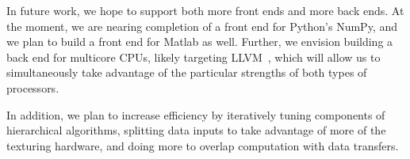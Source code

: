 \documentclass[preprint]{sigplanconf}
\begin{document}
In future work, we hope to support both more front ends and more back ends.  At the moment, we are nearing completion of a front end for Python's NumPy, and we plan to build a front end for Matlab as well.  Further, we envision building a back end for multicore CPUs, likely targeting LLVM~\cite{Latt02}, which will allow us to simultaneously take advantage of the particular strengths of both types of processors.

In addition, we plan to increase efficiency by iteratively tuning components of hierarchical algorithms, splitting data inputs to take advantage of more of the texturing hardware, and doing more to overlap computation with data transfers.


{}
\end{document}
